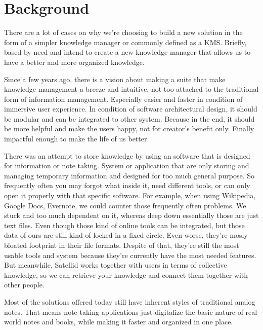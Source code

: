 \section{Background}
\label{sec:background}

There are a lot of cases on why we're choosing to build a new solution in the form of a simpler knowledge manager or commonly defined as a \ac{KMS}.
Briefly, based by need and intend to create a new knowledge manager that allows us to have a better and more organized knowledge.

Since a few years ago, there is a vision about making a suite that make knowledge management a breeze and intuitive, not too attached to the traditional form of information management.
Especially easier and faster in condition of immersive user experience.
In condition of software architectural design, it should be modular and can be integrated to other system.
Because in the end, it should be more helpful and make the users happy, not for creator's benefit only.
Finally impactful enough to make the life of us better.

There was an attempt to store knowledge by using an software that is designed for information or note taking. System or application that are only storing and managing temporary information and designed for too much general purpose.
So frequently often you may forgot what inside it, need different tools, or can only open it properly with that specific software.
For example, when using Wikipedia, Google Docs, Evernote, we could counter those frequently often problems.
We stuck and too much dependent on it, whereas deep down essentially those are just text files.
Even though those kind of online tools can be integrated, but those data of ours are still kind of locked in a fixed circle.
Even worse, they're mosly bloated footprint in their file formats.
Despite of that, they're still the most usable tools and system because they're currently have the most needed features.
But meanwhile, Satellid works together with users in terms of collective knowledge, so we can retrieve your knowledge and connect them together with other people.

Most of the solutions offered today still have inherent styles of traditional analog notes.
That means note taking applications just digitalize the basic nature of real world notes and books, while making it faster and organized in one place.

